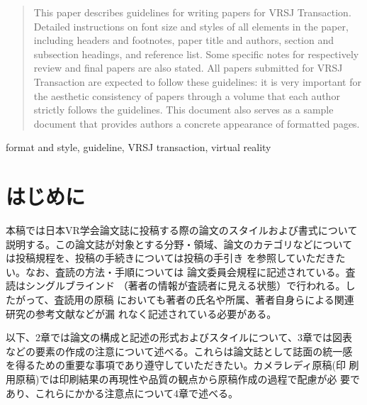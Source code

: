 \documentclass[a4paper,twoside]{jarticle}
\begin{document}

\begin{abstract}
This paper describes guidelines for writing papers for VRSJ
Transaction. Detailed instructions on font size and styles of all
elements in the paper, including headers and footnotes, paper title
and authors, section and subsection headings, and reference list. Some
specific notes for respectively review and final papers are also
stated. All papers submitted for VRSJ Transaction are expected to
follow these guidelines: it is very important for the aesthetic
consistency of papers through a volume that each author strictly
follows the guidelines. This document also serves as a sample document
that provides authors a concrete appearance of formatted pages.
\end{abstract}

\begin{keyword}	
format and style, guideline, VRSJ transaction, virtual reality
\end{keyword}

\maketitle	

\section{はじめに}

本稿では日本VR学会論文誌に投稿する際の論文のスタイルおよび書式について
説明する。この論文誌が対象とする分野・領域、論文のカテゴリなどについて
は投稿規程\cite{toukou}を、投稿の手続きについては投稿の手引き
\cite{tebiki}を参照していただきたい。なお、査読の方法・手順については
論文委員会規程\cite{iinkai}に記述されている。査読はシングルブラインド
（著者の情報が査読者に見える状態）で行われる。したがって、査読用の原稿
においても著者の氏名や所属、著者自身らによる関連研究の参考文献などが漏
れなく記述されている必要がある。

以下、2章では論文の構成と記述の形式およびスタイルについて、3章では図表
などの要素の作成の注意について述べる。これらは論文誌として誌面の統一感
を得るための重要な事項であり遵守していただきたい。カメラレディ原稿(印
刷用原稿)では印刷結果の再現性や品質の観点から原稿作成の過程で配慮が必
要であり、これらにかかる注意点について4章で述べる。
\end{document}
